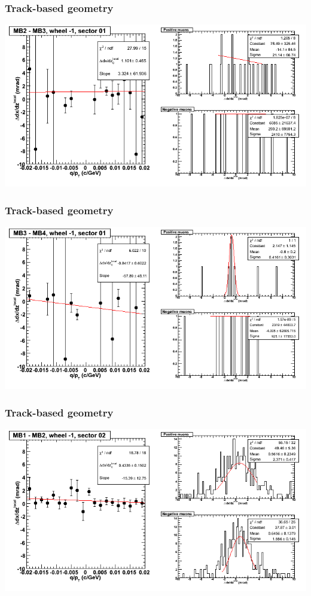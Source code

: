 \documentclass[compress]{beamer}
\begin{document}
\begin{frame}
\frametitle{Track-based geometry}
\includegraphics[width=\linewidth]{NOV4_segdiffs/dt13_slope_B_01_23.png}
\end{frame}

\begin{frame}
\frametitle{Track-based geometry}
\includegraphics[width=\linewidth]{NOV4_segdiffs/dt13_slope_B_01_34.png}
\end{frame}

\begin{frame}
\frametitle{Track-based geometry}
\includegraphics[width=\linewidth]{NOV4_segdiffs/dt13_slope_B_02_12.png}
\end{frame}
\end{document}
